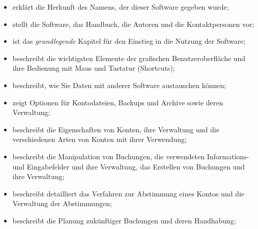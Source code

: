 {\begin{itemize}
	\item {} erklärt die Herkunft des Namens, der dieser Software gegeben wurde;%
	\item {} stellt die Software, das Handbuch, die Autoren und die Kontaktpersonen vor;%
	\item {} ist das \emph{grundlegende} Kapitel für den Einstieg in die Nutzung der Software;%
	\item {} beschreibt die wichtigsten Elemente der grafischen Benutzeroberfläche und ihre Bedienung mit Maus und Tastatur (Shortcuts);%
	\item {} beschreibt, wie Sie Daten mit anderer Software austauschen können;%
	\item {} zeigt Optionen für Kontodateien, Backups und Archive sowie deren Verwaltung;%
	\item {} beschreibt die Eigenschaften von Konten, ihre Verwaltung und die verschiedenen Arten von Konten mit ihrer Verwendung;%
	\item {} beschreibt die Manipulation von Buchungen, die verwendeten Informations- und Eingabefelder und ihre Verwaltung, das Erstellen von Buchungen und ihre Verwaltung;%
	\item {} beschreibt detailliert das Verfahren zur Abstimmung eines Kontos und die Verwaltung der Abstimmungen;%
	\item {} beschreibt die Planung zukünftiger Buchungen und deren Handhabung;%

\end{itemize}}
